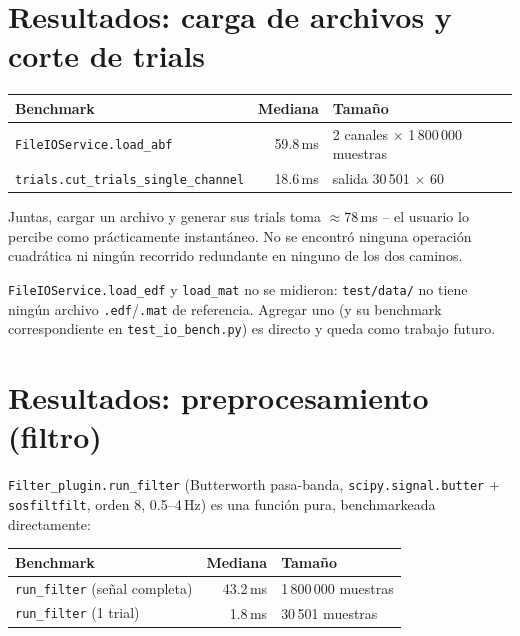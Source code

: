 \documentclass[11pt,a4paper]{article}
\begin{document}
\section{Resultados: carga de archivos y corte de trials}

\begin{center}
\begin{tabular}{lrl}
\toprule
\textbf{Benchmark} & \textbf{Mediana} & \textbf{Tamaño} \\
\midrule
\texttt{FileIOService.load\_\allowbreak abf} & 59.8\,ms & 2 canales $\times$ 1\,800\,000 muestras \\
\texttt{trials.cut\_\allowbreak trials\_\allowbreak single\_\allowbreak channel} & 18.6\,ms & salida 30\,501 $\times$ 60 \\
\bottomrule
\end{tabular}
\end{center}

Juntas, cargar un archivo y generar sus trials toma $\approx$78\,ms -- el usuario lo percibe como
prácticamente instantáneo. No se encontró ninguna operación cuadrática ni ningún recorrido redundante en
ninguno de los dos caminos.

\texttt{FileIOService.load\_\allowbreak edf} y \texttt{load\_\allowbreak mat} no se midieron: \texttt{test/data/}
no tiene ningún archivo \texttt{.edf}/\texttt{.mat} de referencia. Agregar uno (y su benchmark
correspondiente en \texttt{test\_\allowbreak io\_\allowbreak bench.py}) es directo y queda como trabajo
futuro.

\section{Resultados: preprocesamiento (filtro)}

\texttt{Filter\_\allowbreak plugin.run\_\allowbreak filter} (Butterworth pasa-banda, \texttt{scipy.signal.butter}
+ \texttt{sosfiltfilt}, orden 8, 0.5--4\,Hz) es una función pura, benchmarkeada directamente:

\begin{center}
\begin{tabular}{lrl}
\toprule
\textbf{Benchmark} & \textbf{Mediana} & \textbf{Tamaño} \\
\midrule
\texttt{run\_\allowbreak filter} (señal completa) & 43.2\,ms & 1\,800\,000 muestras \\
\texttt{run\_\allowbreak filter} (1 trial) & 1.8\,ms & 30\,501 muestras \\
\bottomrule
\end{tabular}
\end{center}
\end{document}
